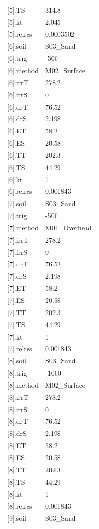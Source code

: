 {\begin{longtable}{p{}p{}}
{}[5].TS & 314.8\\
{}[5].kt & 2.045\\
{}[5].relres & 0.0003502\\
{}[6].soil & S03\_Sand\\
{}[6].trig & -500\\
{}[6].method & M02\_Surface\\
{}[6].irrT & 278.2\\
{}[6].irrS & 0\\
{}[6].drT & 76.52\\
{}[6].drS & 2.198\\
{}[6].ET & 58.2\\
{}[6].ES & 20.58\\
{}[6].TT & 202.3\\
{}[6].TS & 44.29\\
{}[6].kt & 1\\
{}[6].relres & 0.001843\\
{}[7].soil & S03\_Sand\\
{}[7].trig & -500\\
{}[7].method & M01\_Overhead\\
{}[7].irrT & 278.2\\
{}[7].irrS & 0\\
{}[7].drT & 76.52\\
{}[7].drS & 2.198\\
{}[7].ET & 58.2\\
{}[7].ES & 20.58\\
{}[7].TT & 202.3\\
{}[7].TS & 44.29\\
{}[7].kt & 1\\
{}[7].relres & 0.001843\\
{}[8].soil & S03\_Sand\\
{}[8].trig & -1000\\
{}[8].method & M02\_Surface\\
{}[8].irrT & 278.2\\
{}[8].irrS & 0\\
{}[8].drT & 76.52\\
{}[8].drS & 2.198\\
{}[8].ET & 58.2\\
{}[8].ES & 20.58\\
{}[8].TT & 202.3\\
{}[8].TS & 44.29\\
{}[8].kt & 1\\
{}[8].relres & 0.001843\\
{}[9].soil & S03\_Sand\\

\end{longtable}}
